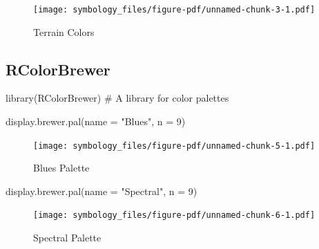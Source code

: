 \documentclass[
  letterpaper,
  DIV=11,
  numbers=noendperiod,
  oneside]{scrreprt}
\newenvironment{Shaded}{\begin{snugshade}}{\end{snugshade}}
\newcommand{\AttributeTok}[1]{\textcolor[rgb]{0.40,0.45,0.13}{#1}}
\newcommand{\CommentTok}[1]{\textcolor[rgb]{0.37,0.37,0.37}{#1}}
\newcommand{\DecValTok}[1]{\textcolor[rgb]{0.68,0.00,0.00}{#1}}
\newcommand{\FunctionTok}[1]{\textcolor[rgb]{0.28,0.35,0.67}{#1}}
\newcommand{\NormalTok}[1]{\textcolor[rgb]{0.00,0.23,0.31}{#1}}
\newcommand{\StringTok}[1]{\textcolor[rgb]{0.13,0.47,0.30}{#1}}
\begin{document}
\begin{figure}[H]

{\centering \texttt{[image: symbology\_files/figure-pdf/unnamed-chunk-3-1.pdf]}

}

\caption{Terrain Colors}

\end{figure}%

\subsection{RColorBrewer}\label{rcolorbrewer}

\begin{Shaded}
\begin{Highlighting}[]
\FunctionTok{library}\NormalTok{(RColorBrewer) }\CommentTok{\# A library for color palettes}
\end{Highlighting}
\end{Shaded}

\begin{Shaded}
\begin{Highlighting}[]
\FunctionTok{display.brewer.pal}\NormalTok{(}\AttributeTok{name =} \StringTok{"Blues"}\NormalTok{, }\AttributeTok{n =} \DecValTok{9}\NormalTok{)}
\end{Highlighting}
\end{Shaded}

\begin{figure}[H]

{\centering \texttt{[image: symbology\_files/figure-pdf/unnamed-chunk-5-1.pdf]}

}

\caption{Blues Palette}

\end{figure}%

\begin{Shaded}
\begin{Highlighting}[]
\FunctionTok{display.brewer.pal}\NormalTok{(}\AttributeTok{name =} \StringTok{"Spectral"}\NormalTok{, }\AttributeTok{n =} \DecValTok{9}\NormalTok{)}
\end{Highlighting}
\end{Shaded}

\begin{figure}[H]

{\centering \texttt{[image: symbology\_files/figure-pdf/unnamed-chunk-6-1.pdf]}

}

\caption{Spectral Palette}

\end{figure}%
\end{document}
